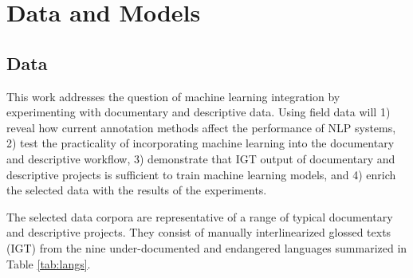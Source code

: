 \chapter{Data and Models}
\label{chap:datamodels}

\section{Data}

This work addresses the question of machine learning integration by experimenting with documentary and descriptive data. Using field data will 1) reveal how current annotation methods affect the performance of NLP systems, 2) test the practicality of incorporating machine learning into the documentary and descriptive workflow, 3) demonstrate that IGT output of documentary and descriptive projects is sufficient to train machine learning models, and 4) enrich the selected data with the results of the experiments.

The selected data corpora are representative of a range of typical documentary and descriptive projects. They consist of manually interlinearized glossed texts (IGT) from the nine under-documented and endangered languages summarized in Table \ref{tab:langs}.   

